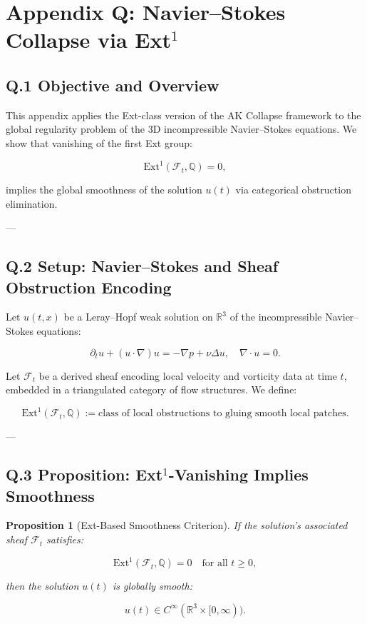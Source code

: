 \documentclass[11pt]{article}
\newtheorem{proposition}[theorem]{Proposition}
\begin{document}

\section*{Appendix Q: Navier–Stokes Collapse via Ext$^1$}

\subsection*{Q.1 Objective and Overview}

This appendix applies the Ext-class version of the AK Collapse framework to the global regularity problem of the 3D incompressible Navier–Stokes equations.  
We show that vanishing of the first Ext group:

\[
\mathrm{Ext}^1(\mathcal{F}_t, \mathbb{Q}) = 0,
\]

implies the global smoothness of the solution $u(t)$ via categorical obstruction elimination.

---

\subsection*{Q.2 Setup: Navier–Stokes and Sheaf Obstruction Encoding}

Let $u(t,x)$ be a Leray–Hopf weak solution on $\mathbb{R}^3$ of the incompressible Navier–Stokes equations:

\[
\partial_t u + (u \cdot \nabla)u = -\nabla p + \nu \Delta u, \quad \nabla \cdot u = 0.
\]

Let $\mathcal{F}_t$ be a derived sheaf encoding local velocity and vorticity data at time $t$, embedded in a triangulated category of flow structures. We define:

\[
\mathrm{Ext}^1(\mathcal{F}_t, \mathbb{Q}) := \text{class of local obstructions to gluing smooth local patches}.
\]

---

\subsection*{Q.3 Proposition: Ext$^1$-Vanishing Implies Smoothness}

\begin{proposition}[Ext-Based Smoothness Criterion]
\label{prop:ExtCollapse}
If the solution’s associated sheaf $\mathcal{F}_t$ satisfies:

\[
\mathrm{Ext}^1(\mathcal{F}_t, \mathbb{Q}) = 0 \quad \text{for all } t \ge 0,
\]

then the solution $u(t)$ is globally smooth:

\[
u(t) \in C^\infty(\mathbb{R}^3 \times [0, \infty)).
\]
\end{proposition}
\end{document}
